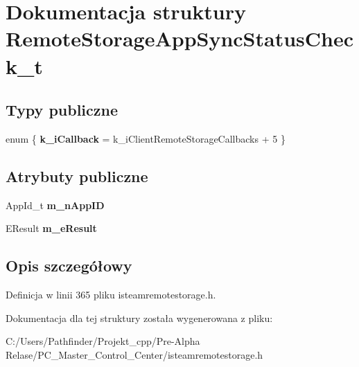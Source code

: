 \hypertarget{struct_remote_storage_app_sync_status_check__t}{}\section{Dokumentacja struktury Remote\+Storage\+App\+Sync\+Status\+Check\+\_\+t}
\label{struct_remote_storage_app_sync_status_check__t}
\subsection*{Typy publiczne}
\begin{DoxyCompactItemize}
\item 
\mbox{\label{struct_remote_storage_app_sync_status_check__t_a08d2f99fec1669591fa5491cdce8eed6}} 
enum \{ {\bfseries k\+\_\+i\+Callback} = k\+\_\+i\+Client\+Remote\+Storage\+Callbacks + 5
 \}
\end{DoxyCompactItemize}
\subsection*{Atrybuty publiczne}
\begin{DoxyCompactItemize}
\item 
\mbox{\label{struct_remote_storage_app_sync_status_check__t_a9a9b6195678c1154e712c8465571e29d}} 
App\+Id\+\_\+t {\bfseries m\+\_\+n\+App\+ID}
\item 
\mbox{\label{struct_remote_storage_app_sync_status_check__t_ae4519063ad68c8d5fd1b7493b06a7331}} 
E\+Result {\bfseries m\+\_\+e\+Result}
\end{DoxyCompactItemize}


\subsection{Opis szczegółowy}


Definicja w linii 365 pliku isteamremotestorage.\+h.



Dokumentacja dla tej struktury została wygenerowana z pliku\+:\begin{DoxyCompactItemize}
\item 
C\+:/\+Users/\+Pathfinder/\+Projekt\+\_\+cpp/\+Pre-\/\+Alpha Relase/\+P\+C\+\_\+\+Master\+\_\+\+Control\+\_\+\+Center/isteamremotestorage.\+h\end{DoxyCompactItemize}
